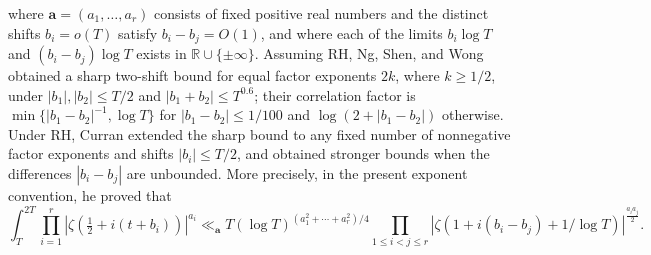 \documentclass[twoside,reqno,11pt,a4paper]{amsart}
\numberwithin{equation}{section}
\theoremstyle{plain}
\theoremstyle{definition}
\theoremstyle{remark}
\renewcommand{\le}{\leqslant}
\renewcommand{\ge}{\geqslant}
\begin{document}
	where $\mathbf{a}=(a_1,\ldots,a_r)$ consists of fixed positive real numbers and the distinct shifts $b_i=o(T)$ satisfy $b_i-b_j=O(1)$, and where each of the limits $b_i\log T$ and $(b_i-b_j)\log T$ exists in $\mathbb R\cup\{\pm\infty\}$. Assuming RH, Ng, Shen, and Wong \cite[Theorem~1.3]{Ng-Shen-wong} obtained a sharp two-shift bound for equal factor exponents $2k$, where $k\ge1/2$, under $|b_1|,|b_2|\le T/2$ and $|b_1+b_2|\le T^{0.6}$; their correlation factor is $\min\{|b_1-b_2|^{-1},\log T\}$ for $|b_1-b_2|\le1/100$ and $\log(2+|b_1-b_2|)$ otherwise. Under RH, Curran \cite[Theorem~1.1]{Curran-Correlation} extended the sharp bound to any fixed number of nonnegative factor exponents and shifts $|b_i|\le T/2$, and obtained stronger bounds when the differences $|b_i-b_j|$ are unbounded. More precisely, in the present exponent convention, he proved that
	\begin{equation}\label{curran-upper-bound}
		\int_{T}^{2T} \prod_{i=1}^{r}\left| \zeta\left(\tfrac{1}{2}+i(t+b_i)\right)\right|^{a_i}\ll_{\mathbf{a}} T(\log T)^{(a_1^2+\cdots + a_{r}^2)/4} \prod_{1\le  i< j\le  r}\left| \zeta(1+i(b_i-b_j)+1/\log T)\right|^{\tfrac{a_ia_j}{2}}.
	\end{equation}
	
	
	
\end{document}
